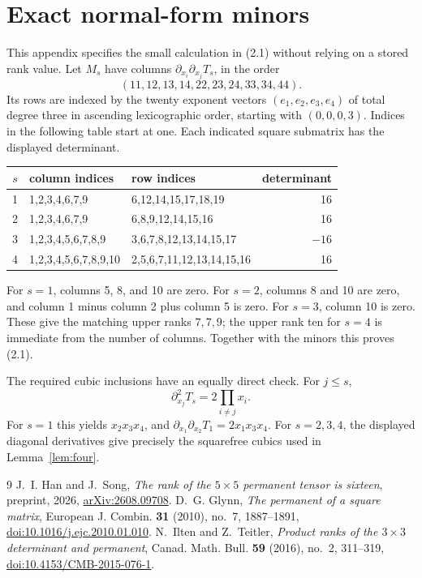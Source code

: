 \documentclass[11pt]{amsart}
\theoremstyle{definition}
\numberwithin{equation}{section}
\begin{document}
\section{Exact normal-form minors}\label{app:minors}
This appendix specifies the small calculation in (2.1) without relying on
a stored rank value. Let \(M_s\) have columns
\(\partial_{x_i}\partial_{x_j}T_s\), in the order
\[
 (11,12,13,14,22,23,24,33,34,44).
\]
Its rows are indexed by the twenty exponent vectors
\((e_1,e_2,e_3,e_4)\) of total degree three in ascending lexicographic
order, starting with \((0,0,0,3)\). Indices in the following table start
at one. Each indicated square submatrix has the displayed determinant.
\begin{center}
\small
\begin{tabular}{@{}cllr@{}}
\toprule
\(s\)&column indices&row indices&determinant\\\midrule
1&1,2,3,4,6,7,9&6,12,14,15,17,18,19&16\\
2&1,2,3,4,6,7,9&6,8,9,12,14,15,16&16\\
3&1,2,3,4,5,6,7,8,9&3,6,7,8,12,13,14,15,17&\(-16\)\\
4&1,2,3,4,5,6,7,8,9,10&2,5,6,7,11,12,13,14,15,16&16\\\bottomrule
\end{tabular}
\end{center}
For \(s=1\), columns 5, 8, and 10 are zero. For \(s=2\), columns 8
and 10 are zero, and column 1 minus column 2 plus column 5 is zero.
For \(s=3\), column 10 is zero. These give the matching upper ranks
\(7,7,9\); the upper rank ten for \(s=4\) is immediate from the number
of columns. Together with the minors this proves (2.1).

The required cubic inclusions have an equally direct check. For
\(j\le s\),
\[
 \partial_{x_j}^2T_s=2\prod_{i\ne j}x_i.
\]
For \(s=1\) this yields \(x_2x_3x_4\), and
\(\partial_{x_1}\partial_{x_2}T_1=2x_1x_3x_4\).
For \(s=2,3,4\), the displayed diagonal derivatives give precisely the
squarefree cubics used in Lemma~\ref{lem:four}.

\begin{thebibliography}{9}
J.~I. Han and J.~Song, \emph{The rank of the \(5\times5\) permanent
tensor is sixteen}, preprint, 2026,
\href{https://arxiv.org/abs/2608.09708}{arXiv:2608.09708}.
D.~G. Glynn, \emph{The permanent of a square matrix},
European J. Combin. \textbf{31} (2010), no.~7, 1887--1891,
\href{https://doi.org/10.1016/j.ejc.2010.01.010}{doi:10.1016/j.ejc.2010.01.010}.
N.~Ilten and Z.~Teitler,
\emph{Product ranks of the \(3\times3\) determinant and permanent},
Canad. Math. Bull. \textbf{59} (2016), no.~2, 311--319,
\href{https://doi.org/10.4153/CMB-2015-076-1}{doi:10.4153/CMB-2015-076-1}.
\end{thebibliography}
\end{document}
